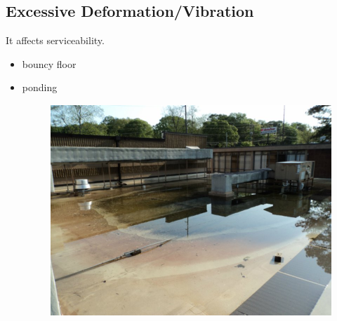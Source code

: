 \subsection{Excessive Deformation/Vibration}
It affects serviceability.
\begin{itemize}
\item bouncy floor
\item ponding
\begin{figure}[H]
\centering\includegraphics[height=8cm]{PIC/CH02/PONDING}
\end{figure}
\end{itemize}
